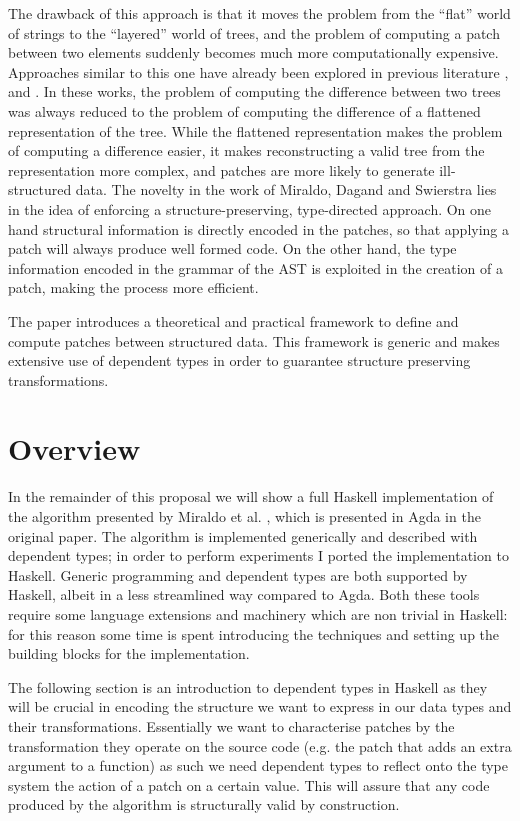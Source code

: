 \documentclass[11pt]{article}
\begin{document}
The drawback of this approach is that it moves the problem from the ``flat'' 
world of strings to the ``layered'' world of trees, and the problem of computing a patch between two elements suddenly
becomes much more computationally expensive. 
Approaches similar to this one have already been explored in previous literature
\cite{semantics-VC}, \cite{structure-aware-VC} and \cite{vassena}. In these works, the problem of computing 
the difference between two trees was always reduced to the problem of computing the difference of a flattened
representation of the tree. While the flattened representation makes the problem of computing a difference 
easier,
it makes reconstructing a valid tree from the representation more complex, and patches are more likely to 
generate ill-structured data.  The novelty in the work of Miraldo, Dagand and Swierstra \cite{type-directed-diff} 
lies in the idea of enforcing a structure-preserving, type-directed approach. On 
one hand structural information is directly encoded in the patches, so that applying a patch will always produce well formed code. On 
the other hand, the type information encoded in the grammar of the AST is 
exploited in the creation of a patch, making the process more efficient.

The paper introduces a theoretical and practical framework to define and compute patches between 
structured data. This framework is generic and makes extensive use of dependent 
types in order to guarantee structure preserving transformations.

\section{Overview}\label{overview}
In the remainder of this proposal we will show a full Haskell implementation of the algorithm presented by Miraldo 
et al. \cite{type-directed-diff}, which is presented in Agda in the original paper. 
The algorithm is implemented generically and described with dependent types; in 
order to perform experiments I ported the implementation to Haskell. Generic 
programming and dependent types are both supported by Haskell, albeit in a less 
streamlined way compared to Agda. Both these tools require some language 
extensions and machinery which are non trivial in Haskell: for this reason some time is spent introducing the
techniques and setting up the building blocks for the implementation. 

The following section is an introduction to dependent types in Haskell as they will be crucial in encoding 
the structure we want to express in our data types and their transformations. 
Essentially we want to characterise patches by the transformation they operate 
on the source code (e.g. the patch that adds an extra argument to a function) as 
such we need dependent types to reflect onto the type system the action of a 
patch on a certain value. This will assure that any code produced by the 
algorithm is structurally valid by construction.
\end{document}
